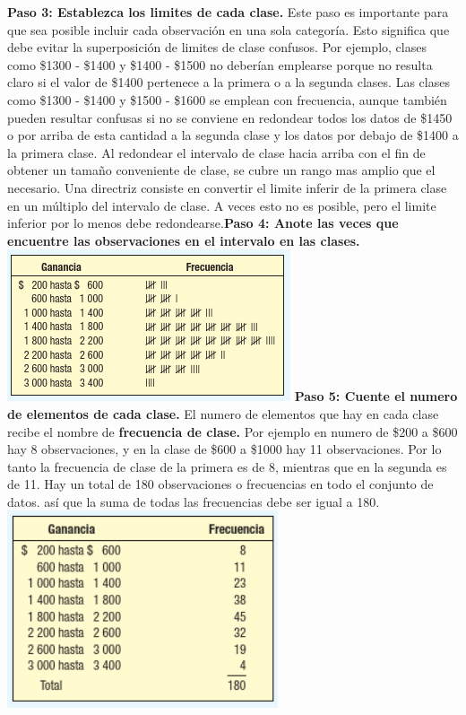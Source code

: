\documentclass[]{article}
\begin{document}
\textbf{Paso 3: Establezca los limites de cada clase.} Este paso es importante para que sea posible incluir cada observación en una sola categoría. Esto significa que debe evitar la superposición de limites de clase confusos. Por ejemplo, clases como \$1300 - \$1400 y \$1400 - \$1500 no deberían emplearse porque no resulta claro si el valor de \$1400 pertenece a la primera o a la segunda clases. Las clases como \$1300 - \$1400 y \$1500 - \$1600 se emplean con frecuencia, aunque también pueden resultar confusas si no se conviene en redondear todos los datos de \$1450 o por arriba de esta cantidad a la segunda clase y los datos por debajo de \$1400 a la primera clase. Al redondear el intervalo de clase hacia arriba con el fin de obtener un tamaño conveniente de clase, se cubre un rango mas amplio que el necesario. Una directriz consiste en convertir el limite inferir de la primera clase en un múltiplo del intervalo de clase. A veces esto no es posible, pero el limite inferior por lo menos debe redondearse.\linebreak[2]
\textbf{Paso 4: Anote las veces que encuentre las observaciones en el intervalo en las clases.}
\\\includegraphics{imagenes/TablaPaso4Cap2.PNG}
\linebreak
\textbf{Paso 5: Cuente el numero de elementos de cada clase.}  El numero de elementos que hay en cada clase recibe el nombre de \textbf{frecuencia de clase.} Por ejemplo en numero de \$200 a \$600 hay 8 observaciones, y en la clase de \$600 a \$1000 hay 11 observaciones. Por lo tanto la frecuencia de clase de la primera es de 8, mientras que en la segunda es de 11. Hay un total de 180 observaciones o frecuencias en todo el conjunto de datos. así que la suma de todas las frecuencias debe ser igual a 180.
\includegraphics[width=8cm]{imagenes/TablaPaso5Cap2.PNG}\linebreak
\end{document}

